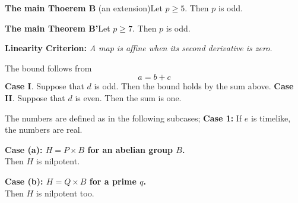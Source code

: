 \documentclass{article}
\begin{document}
{\bf The main Thoerem B} (an extension)\quad Let $p\geq 5$. Then $p$ is odd.

{\bf The main Theorem B'}\quad Let $p\geq 7$. Then $p$ is odd.

\textbf{Linearity Criterion:}
\emph{A map is affine when its second derivative is zero.}

The bound follows from
$$ a = b + c $$
{\bf Case I}. Suppose that $d$ is odd. Then the bound holds
by the sum above.
{\bf Case II}. Suppose that $d$ is even. Then the sum is one.

The numbers are defined as in the
following subcases; \noindent \textbf{Case 1:} If $e$ is timelike, the
numbers are real.

{\bf{Case (a): \; $H=P\times B$ for an abelian group $B$.}}\\
Then $H$ is nilpotent.

{\bf{Case (b): \; $H=Q\times B$ for a prime $q$.}}\\
Then $H$ is nilpotent too.
\end{document}
